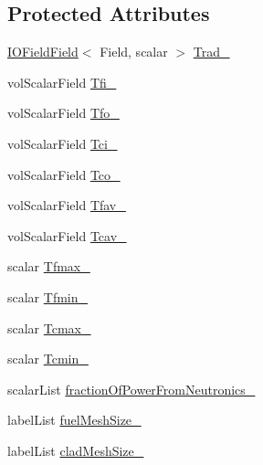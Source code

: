 \subsection*{Protected Attributes}
\begin{DoxyCompactItemize}
\item 
\hyperlink{classFoam_1_1IOFieldField}{I\+O\+Field\+Field}$<$ Field, scalar $>$ \hyperlink{classFoam_1_1powerModels_1_1nuclearFuelPinTest_a22d48bd29c42258de0a8c6a599dafecd}{Trad\+\_\+}
\item 
vol\+Scalar\+Field \hyperlink{classFoam_1_1powerModels_1_1nuclearFuelPinTest_ae5113713ca510bd2c780a3a42d570b68}{Tfi\+\_\+}
\item 
vol\+Scalar\+Field \hyperlink{classFoam_1_1powerModels_1_1nuclearFuelPinTest_aafbf0ec9a477530a70c839a32695007c}{Tfo\+\_\+}
\item 
vol\+Scalar\+Field \hyperlink{classFoam_1_1powerModels_1_1nuclearFuelPinTest_ae311ccceb3b1ab13497cfad4120f30ba}{Tci\+\_\+}
\item 
vol\+Scalar\+Field \hyperlink{classFoam_1_1powerModels_1_1nuclearFuelPinTest_a284ecf0fcaa736dfb6c22cb4f2e432f8}{Tco\+\_\+}
\item 
vol\+Scalar\+Field \hyperlink{classFoam_1_1powerModels_1_1nuclearFuelPinTest_ae27e97dd26523cd7de88fb4d2d8970d2}{Tfav\+\_\+}
\item 
vol\+Scalar\+Field \hyperlink{classFoam_1_1powerModels_1_1nuclearFuelPinTest_a7f0f167e5eca86beb5241b243ba9b5ec}{Tcav\+\_\+}
\item 
scalar \hyperlink{classFoam_1_1powerModels_1_1nuclearFuelPinTest_a41838f208df78067c90a2b0af6b20e5f}{Tfmax\+\_\+}
\item 
scalar \hyperlink{classFoam_1_1powerModels_1_1nuclearFuelPinTest_ac11ce3c46014e65515c96993a4039cf2}{Tfmin\+\_\+}
\item 
scalar \hyperlink{classFoam_1_1powerModels_1_1nuclearFuelPinTest_abfeb31e2295099d7d3ce3d07d53907d4}{Tcmax\+\_\+}
\item 
scalar \hyperlink{classFoam_1_1powerModels_1_1nuclearFuelPinTest_ac0e454e9e139c138d711fba06744779b}{Tcmin\+\_\+}
\item 
scalar\+List \hyperlink{classFoam_1_1powerModels_1_1nuclearFuelPinTest_a9a9fb1406beb9bc51f2e2ccc35e6fd27}{fraction\+Of\+Power\+From\+Neutronics\+\_\+}
\item 
label\+List \hyperlink{classFoam_1_1powerModels_1_1nuclearFuelPinTest_a7adeb17cd9325c9ab59764e067b2c335}{fuel\+Mesh\+Size\+\_\+}
\item 
label\+List \hyperlink{classFoam_1_1powerModels_1_1nuclearFuelPinTest_afa0b03f75735831b28e2ee5b9d607ccf}{clad\+Mesh\+Size\+\_\+}

\end{DoxyCompactItemize}
